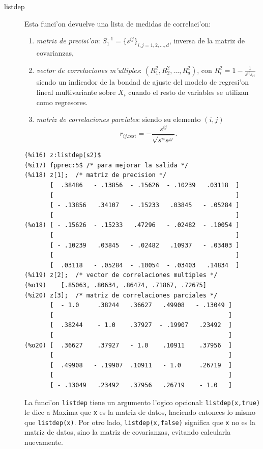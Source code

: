\documentclass[spanish,12pt,a4paper]{article}
\begin{document}
\begin{description}
\item[listdep] Esta funci'on devuelve una lista de medidas de correlaci'on:
\begin{enumerate}
\item \emph{matriz de precisi'on}: $S_1^{-1}=\{s^{ij}\}_{i,j = 1, 2, \ldots, d}$, inversa de la matriz de covarianzas,
\item \emph{vector de correlaciones m'ultiples}: $(R_1^2, R_2^2, \ldots, R_d^2)$, con $R_i^2=1-\frac{1}{s^{ii}s_{ii}}$ siendo un indicador de la bondad de ajuste del modelo de regresi'on lineal multivariante sobre $X_i$ cuando el resto de variables se utilizan como regresores.
\item \emph{matriz de correlaciones parciales}: siendo su elemento $(i, j)$ 
\[
r_{ij.\mbox{rest}}=-\frac{s^{ij}}{\sqrt{s^{ii} s^{jj}}}.
\]
\end{enumerate}
\begin{verbatim}
(%i16) z:listdep(s2)$
(%i17) fpprec:5$ /* para mejorar la salida */
(%i18) z[1];  /* matriz de precision */
       [  .38486   - .13856  - .15626  - .10239   .03118  ]
       [                                                  ]
       [ - .13856   .34107   - .15233   .03845   - .05284 ]
       [                                                  ]
(%o18) [ - .15626  - .15233   .47296   - .02482  - .10054 ]
       [                                                  ]
       [ - .10239   .03845   - .02482   .10937   - .03403 ]
       [                                                  ]
       [  .03118   - .05284  - .10054  - .03403   .14834  ]
(%i19) z[2];  /* vector de correlaciones multiples */
(%o19)    [.85063, .80634, .86474, .71867, .72675]
(%i20) z[3];  /* matriz de correlaciones parciales */
       [  - 1.0     .38244   .36627   .49908   - .13049 ]
       [                                                ]
       [  .38244    - 1.0    .37927  - .19907   .23492  ]
       [                                                ]
(%o20) [  .36627    .37927   - 1.0    .10911    .37956  ]
       [                                                ]
       [  .49908   - .19907  .10911   - 1.0     .26719  ]
       [                                                ]
       [ - .13049   .23492   .37956   .26719    - 1.0   ]
\end{verbatim}

La funci'on \verb|listdep| tiene un argumento l'ogico opcional: \verb|listdep(x,true)| le dice a Maxima que \verb|x| es la matriz de datos, haciendo entonces lo mismo que \verb|listdep(x)|. Por otro lado, \verb|listdep(x,false)| significa que \verb|x| no es la matriz de datos, sino la matriz de covarianzas, evitando calcularla nuevamente.

\end{description}
\end{document}
